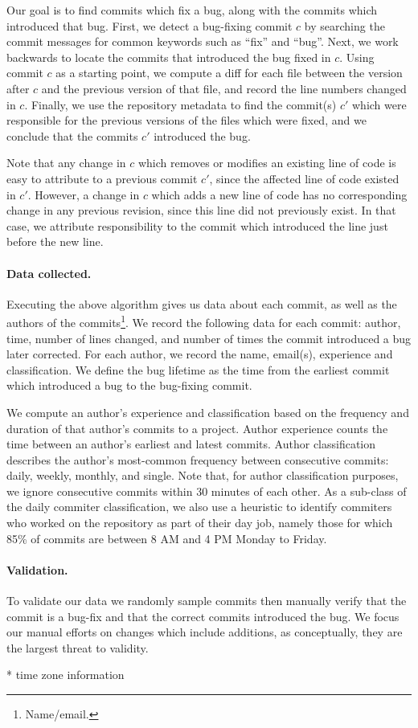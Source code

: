 Our goal is to find commits which fix a bug, along with the commits
which introduced that bug. First, we detect a bug-fixing commit $c$ by
searching the commit messages for common keywords such as ``fix'' and
``bug''. Next, we work backwards to locate the commits that introduced
the bug fixed in $c$. Using commit $c$ as a starting point, we compute
a diff for each file between the version after $c$ and the previous
version of that file, and record the line numbers changed in
$c$. Finally, we use the repository metadata to find the commit(s)
$c'$ which were responsible for the previous versions of the files
which were fixed, and we conclude that the commits $c'$ introduced the
bug.

Note that any change in $c$ which removes or modifies an existing line
of code is easy to attribute to a previous commit $c'$, since the
affected line of code existed in $c'$. However, a change in $c$ which
adds a new line of code has no corresponding change in any previous
revision, since this line did not previously exist. In that case, we
attribute responsibility to the commit which introduced the line just
before the new line.

\paragraph{Data collected.}
Executing the above algorithm gives us data about each commit, as well
as the authors of the commits\footnote{Name/email.}.  We record the
following data for each commit: author, time, number of lines changed,
and number of times the commit introduced a bug later corrected. For
each author, we record the name, email(s), experience and
classification. We define the bug lifetime as the time from the
earliest commit which introduced a bug to the bug-fixing commit.

We compute an author's experience and classification based on the
frequency and duration of that author's commits to a project. Author
experience counts the time between an author's earliest and latest
commits. Author classification describes the author's most-common
frequency between consecutive commits: daily, weekly, monthly, and
single. Note that, for author classification purposes, we ignore
consecutive commits within 30 minutes of each other. As a sub-class of
the daily commiter classification, we also use a heuristic to identify
commiters who worked on the repository as part of their day job,
namely those for which 85\% of commits are between 8 AM and 4 PM
Monday to Friday.

\paragraph{Validation.}
To validate our data we randomly sample commits then manually verify
that the commit is a bug-fix and that the correct commits introduced
the bug. We focus our manual efforts on changes which include
additions, as conceptually, they are the largest threat to validity.


* time zone information
